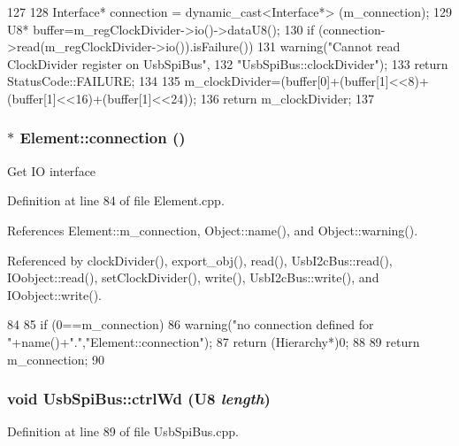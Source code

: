 \begin{DoxyCode}
127                                          {
128   Interface* connection = dynamic_cast<Interface*> (m_connection);
129   U8* buffer=m_regClockDivider->io()->dataU8();
130   if (connection->read(m_regClockDivider->io()).isFailure()){
131     warning("Cannot read ClockDivider register on UsbSpiBus",
132         "UsbSpiBus::clockDivider");
133     return StatusCode::FAILURE;
134   } 
135   m_clockDivider=(buffer[0]+(buffer[1]<<8)+(buffer[1]<<16)+(buffer[1]<<24));
136   return m_clockDivider;
137 }
\end{DoxyCode}
\hypertarget{classElement_af57444353c1ddf9fa0109801e97debf7}{
\subsubsection[{connection}]{ $\ast$ Element::connection ()}}
\label{classElement_af57444353c1ddf9fa0109801e97debf7}
Get IO interface 

Definition at line 84 of file Element.cpp.

References Element::m\_\-connection, Object::name(), and Object::warning().

Referenced by clockDivider(), export\_\-obj(), read(), UsbI2cBus::read(), IOobject::read(), setClockDivider(), write(), UsbI2cBus::write(), and IOobject::write().


\begin{DoxyCode}
84                               {
85   if (0==m_connection){
86     warning("no connection defined for "+name()+".","Element::connection");
87     return (Hierarchy*)0;
88   }
89   return m_connection;
90 }
\end{DoxyCode}
\hypertarget{classUsbSpiBus_a150304008d73d14c93d25765050ddb05}{
\subsubsection[{ctrlWd}]{\setlength{\rightskip}{0pt plus 5cm}void UsbSpiBus::ctrlWd ({\bf U8} {\em length})}}
\label{classUsbSpiBus_a150304008d73d14c93d25765050ddb05}


Definition at line 89 of file UsbSpiBus.cpp.

